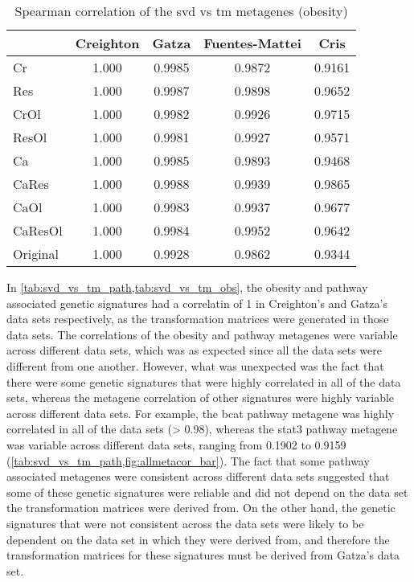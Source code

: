 \begin{table}[htpb]
	\centering
	\caption{Spearman correlation of the svd vs tm metagenes (obesity)}
	\label{tab:svd_vs_tm_obs}
	\begin{tabular}{lcccc}
		& Creighton & Gatza  & Fuentes-Mattei & Cris\\
		\hline
		\rule{0pt}{2.25ex} Cr & 1.000     & 0.9985 & 0.9872 & 0.9161 \\
		Res                   & 1.000     & 0.9987 & 0.9898 & 0.9652 \\
		CrOl                  & 1.000     & 0.9982 & 0.9926 & 0.9715 \\
		ResOl                 & 1.000     & 0.9981 & 0.9927 & 0.9571 \\
		Ca                    & 1.000     & 0.9985 & 0.9893 & 0.9468 \\
		CaRes                 & 1.000     & 0.9988 & 0.9939 & 0.9865 \\
		CaOl                  & 1.000     & 0.9983 & 0.9937 & 0.9677 \\
		CaResOl               & 1.000     & 0.9984 & 0.9952 & 0.9642 \\
		Original              & 1.000     & 0.9928 & 0.9862 & 0.9344 \\
	\end{tabular}
\end{table}

In \cref{tab:svd_vs_tm_path,tab:svd_vs_tm_obs}, the obesity and pathway associated genetic signatures had a correlatin of 1 in Creighton's and Gatza's data sets respectively, as the transformation matrices were generated in those data sets.
The correlations of the obesity and pathway metagenes were variable across different data sets, which was as expected since all the data sets were different from one another.
However, what was unexpected was the fact that there were some genetic signatures that were highly correlated in all of the data sets, whereas the metagene correlation of other signatures were highly variable across different data sets.
For example, the \gls{bcat} pathway metagene was highly correlated in all of the data sets (\textgreater{} 0.98), whereas the \gls{stat3} pathway metagene was variable across different data sets, ranging from 0.1902 to 0.9159 (\cref{tab:svd_vs_tm_path,fig:allmetacor_bar}).
The fact that some pathway associated metagenes were consistent across different data sets suggested that some of these genetic signatures were reliable and did not depend on the data set the transformation matrices were derived from.
On the other hand, the genetic signatures that were not consistent across the data sets were likely to be dependent on the data set in which they were derived from, and therefore the transformation matrices for these signatures must be derived from Gatza's data set.

